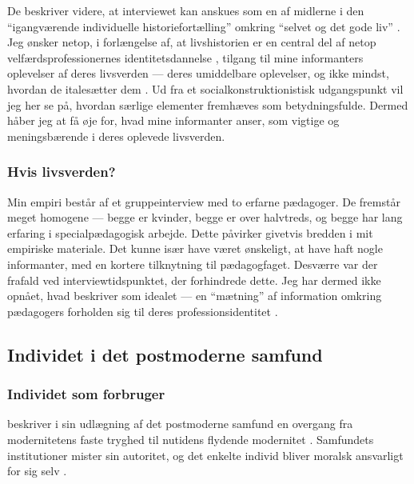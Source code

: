 De beskriver videre, at interviewet kan anskues som en af midlerne i den “igangværende individuelle historiefortælling” omkring “selvet og det gode liv” \autocite[s. 30]{tanggaardInterviewetSamtalenSom2015}.
Jeg ønsker netop, i forlængelse af, at livshistorien er en central del af netop velfærdsprofessionernes identitetsdannelse \autocite[s. 457ff]{frederiksenVelfaerdsprofessionerMellemOmsorg2017}, tilgang til mine informanters oplevelser af deres livsverden — deres umiddelbare oplevelser, og ikke mindst, hvordan de italesætter dem \autocite[s. 31]{tanggaardInterviewetSamtalenSom2015}.
Ud fra et socialkonstruktionistisk udgangspunkt vil jeg her se på, hvordan særlige elementer fremhæves som betydningsfulde.
Dermed håber jeg at få øje for, hvad mine informanter anser, som vigtige og meningsbærende i deres oplevede livsverden.

\subsubsection{Hvis livsverden?}
Min empiri består af et gruppeinterview med to erfarne pædagoger.
De fremstår meget homogene — begge er kvinder, begge er over halvtreds, og begge har lang erfaring i specialpædagogisk arbejde.
Dette påvirker givetvis bredden i mit empiriske materiale.
Det kunne især have været ønskeligt, at have haft nogle informanter, med en kortere tilknytning til pædagogfaget.
Desværre var der frafald ved interviewtidspunktet, der forhindrede dette.
Jeg har dermed ikke opnået, hvad \autocite{tanggaardInterviewetSamtalenSom2015} beskriver som idealet — en “mætning” af information omkring pædagogers forholden sig til deres professionsidentitet \autocite[s. 32]{tanggaardInterviewetSamtalenSom2015}.

\subsection{Individet i det postmoderne samfund}

\subsubsection{Individet som forbruger}
\citeauthor{baumanLiquidModernity2000} beskriver i sin udlægning af det postmoderne samfund en overgang fra modernitetens faste tryghed til nutidens flydende modernitet \autocite[s. 2]{baumanLiquidModernity2000}.
Samfundets institutioner mister sin autoritet, og det enkelte individ bliver moralsk ansvarligt for sig selv \autocite[s. 64ff]{baumanLiquidModernity2000}.

